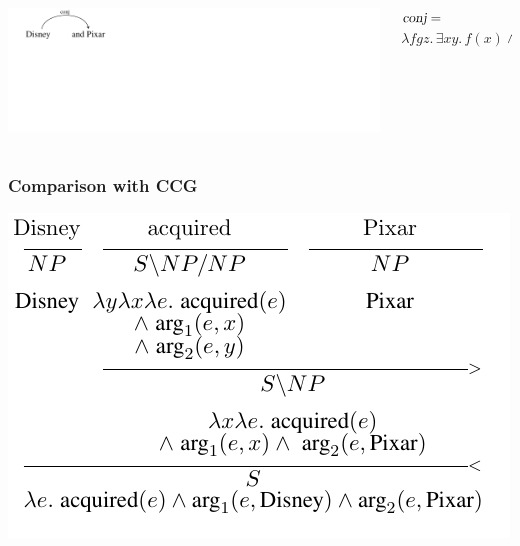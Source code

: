 \documentclass[mathserif,12pt]{beamer}
\newcommand \ignore[1]{}
\renewcommand{\land}{\wedge}
\newcommand{\lspace}{.\,}
\begin{document}
\begin{frame}
  \vspace{0.6cm}
 \begin{columns}
  \begin{column}{0.39\textwidth}
   \centering
\includegraphics[trim=1em 9em 28em 0em,clip=true,scale=1.3]{figures/conj}   
  \end{column}
  \begin{column}{0.61\textwidth}
\large    $\textsl{conj} =$ \\ $ \lambda f g z \lspace \exists x y \lspace f(x) \land g(y) \land \mathrm{coord}(z,x,y)$ 
  \end{column}
 \end{columns}
\end{frame}

\ignore{
\begin{frame}[noframenumbering]
\frametitle{Dependencies to Logical Forms}
 \begin{block}{}
 \vspace{2cm}
  \centering \Huge
  Total number of rules: 46
  \vspace{2cm}
  \end{block}
\end{frame}
}


\begin{frame}
\frametitle{Comparison with CCG}
\centering
\includegraphics[scale=1]{figures/ccg-transitive}
\end{frame}
 
\end{document}

